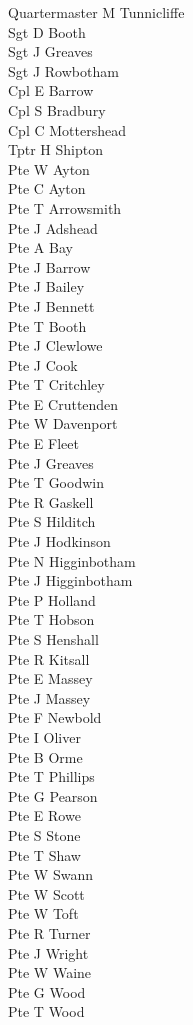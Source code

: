 \begin{multicols}{2}
  \noindent
  Quartermaster M Tunnicliffe \\
  Sgt D Booth \\
  Sgt J Greaves \\
  Sgt J Rowbotham \\
  Cpl E Barrow \\
  Cpl S Bradbury \\
  Cpl C Mottershead \\
  Tptr H Shipton \\
  Pte W Ayton \\
  Pte C Ayton \\
  Pte T Arrowsmith \\
  Pte J Adshead \\
  Pte A Bay \\
  Pte J Barrow \\
  Pte J Bailey \\
  Pte J Bennett \\
  Pte T Booth \\
  Pte J Clewlowe \\
  Pte J Cook \\
  Pte T Critchley \\
  Pte E Cruttenden \\
  Pte W Davenport \\
  Pte E Fleet \\
  Pte J Greaves \\
  Pte T Goodwin \\
  Pte R Gaskell \\
  Pte S Hilditch \\
  Pte J Hodkinson \\
  Pte N Higginbotham \\
  Pte J Higginbotham \\
  Pte P Holland \\
  Pte T Hobson \\
  Pte S Henshall \\
  Pte R Kitsall \\
  Pte E Massey \\
  Pte J Massey \\
  Pte F Newbold \\
  Pte I Oliver \\
  Pte B Orme \\
  Pte T Phillips \\
  Pte G Pearson \\
  Pte E Rowe \\
  Pte S Stone \\
  Pte T Shaw \\
  Pte W Swann \\
  Pte W Scott \\
  Pte W Toft \\
  Pte R Turner \\
  Pte J Wright \\
  Pte W Waine \\
  Pte G Wood \\
  Pte T Wood \\
\end{multicols}

